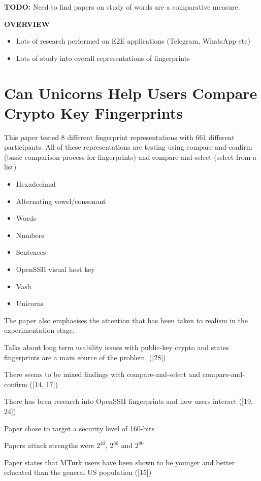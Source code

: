 \textbf{TODO:} Need to find papers on study of words are a comparative measure.

\textbf{OVERVIEW} 
\begin{itemize}
    \item Lots of research performed on E2E applications (Telegram, WhatsApp etc)
    \item Lots of study into overall representations of fingerprints
\end{itemize}

\section{Can Unicorns Help Users Compare Crypto Key Fingerprints}

This paper tested 8 different fingerprint representations with 661 different participants. All of these representations are testing using compare-and-confirm (basic comparison process for fingerprints) and compare-and-select (select from a list)

\begin{itemize}
    \item Hexadecimal
    \item Alternating vowel/consonant
    \item Words
    \item Numbers
    \item Sentences
    \item OpenSSH visual host key
    \item Vash
    \item Unicorns
\end{itemize}

The paper also emphasises the attention that has been taken to realism in the experimentation stage.

Talks about long term usability issues with public-key crypto and states fingerprints are a main source of the problem. ([28])

There seems to be mixed findings with compare-and-select and compare-and-confirm ([14, 17])

There has been research into OpenSSH fingerprints and how users interact ([19, 24])

Paper chose to target a security level of 160-bits

Papers attack strengths were $2^{40}$, $2^{60}$ and $2^{80}$

Paper states that MTurk users have been shown to be younger and better educated than the general US population ([15])

